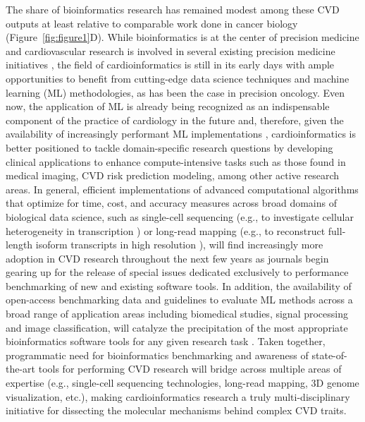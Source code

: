 \documentclass[letter]{bib}
\begin{document}
The share of bioinformatics research has remained modest among these CVD outputs at least relative to comparable work done in cancer biology (Figure~\ref{fig:figure1}D). While bioinformatics is at the center of precision medicine \citep{Gomez-Lopez:2017:Precision} and cardiovascular research is involved in several existing precision medicine initiatives \citep{Houser:2016:American,czbiohub:2018:Chan}, the field of cardioinformatics is still in its early days with ample opportunities to benefit from cutting-edge data science techniques and machine learning (ML) methodologies, as has been the case in precision oncology. Even now, the application of ML is already being recognized as an indispensable component of the practice of cardiology in the future \citep{Shameer:2017:Translational,Shameer:2018:Machine} and, therefore, given the availability of increasingly performant ML implementations \citep{MLPerf:2018:MLPerf}, cardioinformatics is better positioned to tackle domain-specific research questions by developing clinical applications to enhance compute-intensive tasks such as those found in medical imaging, CVD risk prediction modeling, among other active research areas. In general, efficient implementations of advanced computational algorithms that optimize for time, cost, and accuracy measures across broad domains of biological data science, such as single-cell sequencing \citep{Becht:2018:Evaluation} (e.g., to investigate cellular heterogeneity in transcription \citep{Wirka:2018:Advancesa}) or long-read mapping \citep{Li:2018:Minimap2} (e.g., to reconstruct full-length isoform transcripts in high resolution \citep{Wirka:2018:Advancesa}), will find increasingly more adoption in CVD research throughout the next few years as journals begin gearing up for the release of special issues dedicated exclusively to performance benchmarking of new and existing software tools.  In addition, the availability of open-access benchmarking data and guidelines to evaluate ML methods across a broad range of application areas including biomedical studies, signal processing and image classification, will catalyze the precipitation of the most appropriate bioinformatics software tools for any given research task \citep{Olson:2017:PMLB,Weber:2018:Essential}.  Taken together, programmatic need for bioinformatics benchmarking and awareness of state-of-the-art tools for performing CVD research will bridge across multiple areas of expertise (e.g., single-cell sequencing technologies, long-read mapping, 3D genome visualization, etc.), making cardioinformatics research a truly multi-disciplinary initiative for dissecting the molecular mechanisms behind complex CVD traits.   
\end{document}
